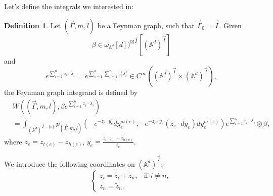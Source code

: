 \documentclass[11pt]{amsart}
\theoremstyle{definition}
\newtheorem{defn}[thm]{Definition}
\theoremstyle{remark}
\numberwithin{equation}{section}
\begin{document}
Let's define the integrals we interested in:
\begin{defn}
    Let $(\vec{\Gamma},m,l)$ be a Feynman graph, such that $\vec{\Gamma}_{0}=\vec{I}$. Given 
    $$
    \beta\in \omega_{\mathbb{A}^{d}}[d])^{\boxtimes\vec{I}}[(\mathbb{A}^{d})^{\vec{I}}]
    $$
    and
    $$
    e^{\sum_{i=1}^{n}z_{i}\cdot\lambda_{i}}=e^{\sum_{s=1}^{d}\sum_{i=1}^{n}z^{s}_{i}\lambda^{s}_{i}}\in C^{\infty}((\mathbb{A}^{d})^{\vec{I}}\times (\mathbb{A}^{d})^{\vec{I}}),
    $$
    the Feynman graph integrand is defined by 
    \begin{align*}
        &W((\vec{\Gamma},m,l),\beta e^{\sum_{i=1}^{n}z_{i}\cdot\lambda_{i}})\\
        &=
        \int_{(\mathbb{A}^{d})^{\vec{I}-\{n\}}}p_{(\vec{\Gamma},m,l)}(-e^{-z_{e}\cdot y_{e}}dy_{e}^{m(e)},-e^{-z_{e}\cdot y_{e}}(z_{e}\cdot dy_{e})dy_{e}^{m(e)})e^{\sum_{i=1}^{n}z_{i}\cdot\lambda_{i}}\otimes \beta,
    \end{align*}
    where $z_{e}=z_{t(e)}-z_{h(e)}$, $y_{e}=\frac{\bar{z}_{t(e)}-\bar{z}_{h(e)}}{t_{e}}$.
\end{defn}

We introduce the following coordinates on $(\mathbb{A}^{d})^{\vec{I}}$:
$$
\begin{cases}
    z_{i}=\tilde{z}_{i}+\tilde{z}_{n}, &\text{if }i\neq n,\\
    z_{n}=\tilde{z}_{n}.
\end{cases}
$$
\end{document}
